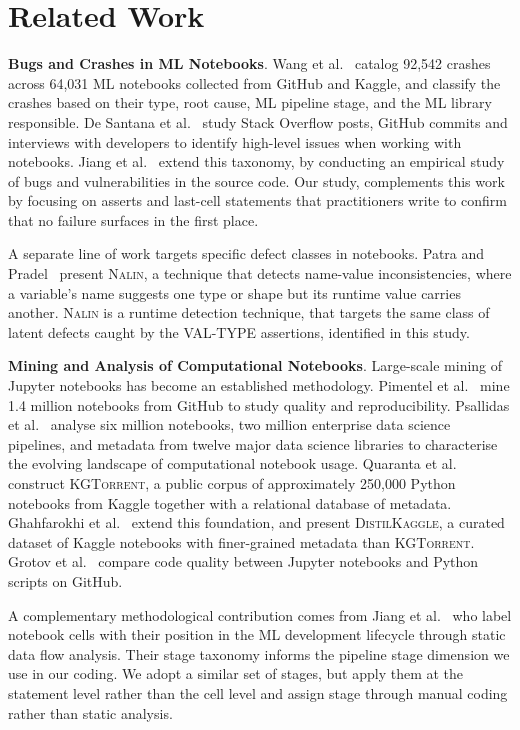 \documentclass[a4paper,USenglish,cleveref,autoref,thm-restate,anonymous]{lipics-v2021}       %
\begin{document}
\section{Related Work}

\textbf{Bugs and Crashes in ML Notebooks}.
Wang et al.~\cite{wang2025why} catalog 92,542 crashes across 64,031 ML notebooks
collected from GitHub and Kaggle,
and classify the crashes based on their
type, root cause, ML pipeline stage, and the ML library responsible.
De Santana et al.~\cite{desantana2024bug} study Stack Overflow posts,
GitHub commits and interviews with developers to identify high-level issues
when working with notebooks.
Jiang et al.~\cite{jiang2025exploring} extend this taxonomy,
by conducting an empirical study of bugs and vulnerabilities in the source code.
Our study, complements this work
by focusing on asserts and last-cell statements
that practitioners write
to confirm that no failure surfaces in the first place.

A separate line of work targets specific defect classes in notebooks.
Patra and Pradel~\cite{patra2022nalin}
present \textsc{Nalin},
a technique that detects name-value inconsistencies,
where a variable's name suggests one type or shape
but its runtime value carries another.
\textsc{Nalin} is a runtime detection technique,
that targets the same class of latent defects
caught by the VAL-TYPE assertions,
identified in this study.

\textbf{Mining and Analysis of Computational Notebooks}.
Large-scale mining of Jupyter notebooks has become an established methodology.
Pimentel et al.~\cite{pimentel2019large-scale} mine 1.4 million notebooks from GitHub
to study quality and reproducibility.
Psallidas et al.~\cite{psallidas2019data} analyse six million notebooks,
two million enterprise data science pipelines,
and metadata from twelve major data science libraries
to characterise the evolving landscape of computational notebook usage.
Quaranta et al.~\cite{quaranta2021kgtorrent} construct \textsc{KGTorrent},
a public corpus of approximately 250,000 Python notebooks from Kaggle
together with a relational database of metadata.
Ghahfarokhi et al.~\cite{ghahfarokhi2024distilkaggle} extend this foundation,
and present \textsc{DistilKaggle},
a curated dataset of Kaggle notebooks
with finer-grained metadata than \textsc{KGTorrent}.
Grotov et al.~\cite{grotov2022large-scale} compare
code quality between Jupyter notebooks and Python scripts on GitHub.

A complementary methodological contribution comes from Jiang et al.~\cite{jiang2022elevating}
who label notebook cells with their position in the ML development lifecycle
through static data flow analysis.
Their stage taxonomy informs the pipeline stage dimension we use in our coding.
We adopt a similar set of stages,
but apply them at the statement level rather than the cell level
and assign stage through manual coding rather than static analysis.
\end{document}
